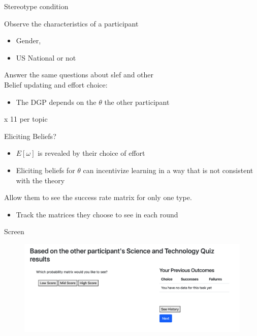 \documentclass[aspectratio=169]{beamer}
\begin{document}
\begin{frame}{Stereotype condition}

    Observe the characteristics of a participant \\
    \begin{itemize}
        \item Gender, 
        \item US National or not \\
    \end{itemize}
    \bigskip
    Answer the same questions about slef and other\\

    \bigskip
    Belief updating and effort choice:\\
    \begin{itemize}
        \item  The DGP depends on the $\theta$ the other participant
    \end{itemize}
    \bigskip
    x 11 per topic

\end{frame}

\begin{frame}{Eliciting Beliefs?}
    \begin{itemize}

        \item $E[\omega]$ is revealed by their choice of effort\\
        \bigskip
        \item Eliciting beliefs for $\theta$ can incentivize learning in a way that is not consistent with the theory\\
        \bigskip
        
    \end{itemize}

    Allow them to see the success rate matrix for only one type. 
    \begin{itemize}
        \item Track the matrices they choose to see in each round
    \end{itemize}

\end{frame}


\begin{frame}{Screen}
    \begin{figure}
        \centering
        \includegraphics[scale=.4]{screen1.png}
    \end{figure}
\end{frame}
\end{document}

